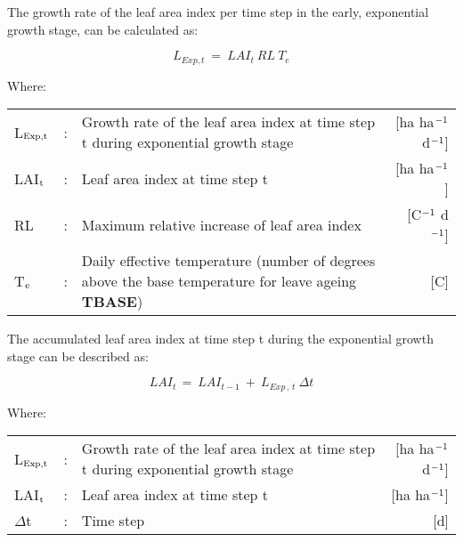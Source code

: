 The growth rate of the leaf area index per time step in the early, exponential growth stage, can be calculated as:

\begin{equation}
L _{Exp,t} ~=~LAI_{t}~RL~T_{e}
\end{equation}

Where:\\[5pt]
\begin{tabularx}{\textwidth}{llXr}
	L$_{{\rm Exp,t}}$ &:& Growth rate of the leaf area index at time step t
	during exponential growth stage   &    [ha ha$^{{\rm -1}}$ d$^{{\rm -1}}$]\\
	LAI$_{{\rm t}}$ &:& Leaf area index at time step t    &
	[ha ha$^{{\rm -1}}$]\\
	RL &:& Maximum relative increase of leaf area index   &
	[\degrees C$^{{\rm -1}}$ d$^{{\rm -1}}$]\\
	T$_{{\rm e}}$ &:& Daily effective temperature (number of degrees above the base temperature for leave ageing {\bf TBASE})   &
	[\degrees C]\\
\end{tabularx}


The accumulated leaf area index at time step t during the exponential growth stage can be
described as:

\begin{equation}
\label{eq:5.51}
LAI _{t~} =~LAI _{t-1} ~+~L _{Exp\, ,\, t} ~\Delta t
\end{equation}

Where:\\[5pt]
\begin{tabularx}{\textwidth}{llXr}
	L$_{{\rm Exp,t}}$ &:& Growth rate of the leaf area index at time step t
	during exponential growth stage    &    [ha ha$^{{\rm -1}}$ d$^{{\rm -1}}$]\\
	LAI$_{{\rm t}}$ &:& Leaf area index at time step t   &
	[ha ha$^{{\rm -1}}$]\\
	$\Delta$t &:& Time step   &    [d]
\end{tabularx}

